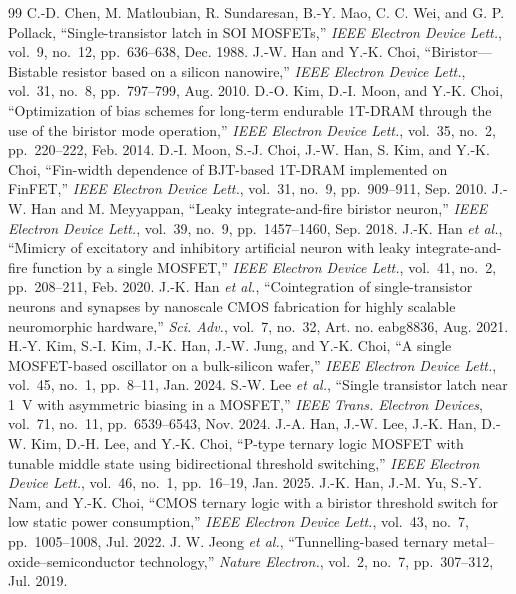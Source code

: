 \documentclass[journal]{IEEEtran}
\begin{document}
\begin{thebibliography}{99}
 C.-D. Chen, M. Matloubian, R. Sundaresan, B.-Y. Mao, C. C. Wei, and G. P. Pollack, ``Single-transistor latch in SOI MOSFETs,'' \emph{IEEE Electron Device Lett.}, vol.~9, no.~12, pp.~636--638, Dec. 1988.
 J.-W. Han and Y.-K. Choi, ``Biristor---Bistable resistor based on a silicon nanowire,'' \emph{IEEE Electron Device Lett.}, vol.~31, no.~8, pp.~797--799, Aug. 2010.
 D.-O. Kim, D.-I. Moon, and Y.-K. Choi, ``Optimization of bias schemes for long-term endurable 1T-DRAM through the use of the biristor mode operation,'' \emph{IEEE Electron Device Lett.}, vol.~35, no.~2, pp.~220--222, Feb. 2014.
 D.-I. Moon, S.-J. Choi, J.-W. Han, S. Kim, and Y.-K. Choi, ``Fin-width dependence of BJT-based 1T-DRAM implemented on FinFET,'' \emph{IEEE Electron Device Lett.}, vol.~31, no.~9, pp.~909--911, Sep. 2010.
 J.-W. Han and M. Meyyappan, ``Leaky integrate-and-fire biristor neuron,'' \emph{IEEE Electron Device Lett.}, vol.~39, no.~9, pp.~1457--1460, Sep. 2018.
 J.-K. Han \emph{et al.}, ``Mimicry of excitatory and inhibitory artificial neuron with leaky integrate-and-fire function by a single MOSFET,'' \emph{IEEE Electron Device Lett.}, vol.~41, no.~2, pp.~208--211, Feb. 2020.
 J.-K. Han \emph{et al.}, ``Cointegration of single-transistor neurons and synapses by nanoscale CMOS fabrication for highly scalable neuromorphic hardware,'' \emph{Sci. Adv.}, vol.~7, no.~32, Art. no. eabg8836, Aug. 2021.
 H.-Y. Kim, S.-I. Kim, J.-K. Han, J.-W. Jung, and Y.-K. Choi, ``A single MOSFET-based oscillator on a bulk-silicon wafer,'' \emph{IEEE Electron Device Lett.}, vol.~45, no.~1, pp.~8--11, Jan. 2024.
 S.-W. Lee \emph{et al.}, ``Single transistor latch near 1~V with asymmetric biasing in a MOSFET,'' \emph{IEEE Trans. Electron Devices}, vol.~71, no.~11, pp.~6539--6543, Nov. 2024.
 J.-A. Han, J.-W. Lee, J.-K. Han, D.-W. Kim, D.-H. Lee, and Y.-K. Choi, ``P-type ternary logic MOSFET with tunable middle state using bidirectional threshold switching,'' \emph{IEEE Electron Device Lett.}, vol.~46, no.~1, pp.~16--19, Jan. 2025.
 J.-K. Han, J.-M. Yu, S.-Y. Nam, and Y.-K. Choi, ``CMOS ternary logic with a biristor threshold switch for low static power consumption,'' \emph{IEEE Electron Device Lett.}, vol.~43, no.~7, pp.~1005--1008, Jul. 2022.
 J. W. Jeong \emph{et al.}, ``Tunnelling-based ternary metal--oxide--semiconductor technology,'' \emph{Nature Electron.}, vol.~2, no.~7, pp.~307--312, Jul. 2019.

\end{thebibliography}
\end{document}
